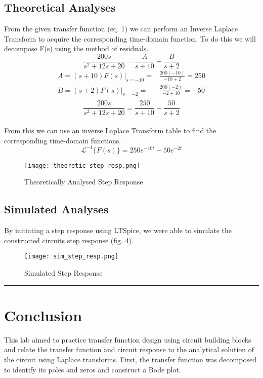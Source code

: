 \documentclass[12pt]{article}
\begin{document}
\subsection*{\textcolor{mycolor}{Theoretical Analyses}}
From the given transfer function (eq. 1) we can perform an Inverse Laplace Transform to acquire the corresponding time-domain function. To do this we will decompose F(s) using the method of residuals.
\begin{equation*}
    \frac{200s}{s^2+12s+20} = \frac{A}{s+10} + \frac{B}{s+2}
\end{equation*}
\begin{align*}
    A=(s+10)F(s)|_{s=-10}=& \frac{200(-10)}{-10+2} = 250\\
    B=(s+2)F(s)|_{s=-2}=& \frac{200(-2)}{-2+10} = -50\\
\end{align*}
\begin{equation*}
    \frac{200s}{s^2+12s+20} = \frac{250}{s+10} - \frac{50}{s+2}
\end{equation*}
\\
From this we can use an inverse Laplace Transform table to find the corresponding time-domain functions.
\begin{equation*}
    \mathcal{L}^{-1}\{F(s)\}=250e^{-10t}-50e^{-2t}
\end{equation*}

\begin{figure}[H]
    \centering
    \texttt{[image: theoretic\_step\_resp.png]}
    \caption{Theoretically Analysed Step Response}
    \label{fig:Theoretically Analysed Step Response}
\end{figure}

\subsection*{\textcolor{mycolor}{Simulated Analyses}}
By initiating a step response using LTSpice, we were able to simulate the constructed circuits step response (fig. 4). 
\begin{figure}[H]
    \centering
    \texttt{[image: sim\_step\_resp.png]}
    \caption{Simulated Step Response}
    \label{fig:Simulated Step Response}
\end{figure}
\vspace{5mm}
\hrule

\section*{\textcolor{mycolor}{Conclusion}}
This lab aimed to practice transfer function design using circuit building blocks and relate the transfer function and circuit response to the analytical solution of the circuit using Laplace transforms. First, the transfer function was decomposed to identify its poles and zeros and construct a Bode plot. 
\end{document}
